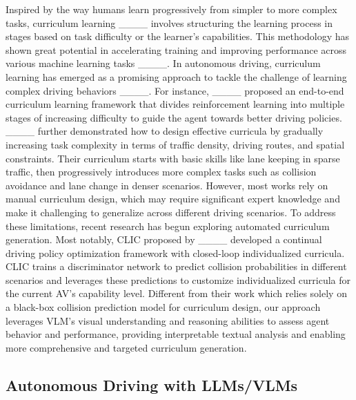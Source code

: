 Inspired by the way humans learn progressively from simpler to more complex tasks, curriculum learning ____ involves structuring the learning process in stages based on task difficulty or the learner’s capabilities. This methodology has shown great potential in accelerating training and improving performance across various machine learning tasks ____. In autonomous driving, curriculum learning has emerged as a promising approach to tackle the challenge of learning complex driving behaviors ____. For instance, ____ proposed an end-to-end curriculum learning framework that divides reinforcement learning into multiple stages of increasing difficulty to guide the agent towards better driving policies. ____ further demonstrated how to design effective curricula by gradually increasing task complexity in terms of traffic density, driving routes, and spatial constraints. Their curriculum starts with basic skills like lane keeping in sparse traffic, then progressively introduces more complex tasks such as collision avoidance and lane change in denser scenarios. 
However, most works rely on manual curriculum design, which may require significant expert knowledge and make it challenging to generalize across different driving scenarios. To address these limitations, recent research has begun exploring automated curriculum generation. Most notably, CLIC proposed by ____ developed a continual driving policy optimization framework with closed-loop individualized curricula. CLIC trains a discriminator network to predict collision probabilities in different scenarios and leverages these predictions to customize individualized curricula for the current AV's capability level.
Different from their work which relies solely on a black-box collision prediction model for curriculum design, our approach leverages VLM's visual understanding and reasoning abilities to assess agent behavior and performance, providing interpretable textual analysis and enabling more comprehensive and targeted curriculum generation.


\subsection{Autonomous Driving with LLMs/VLMs}

